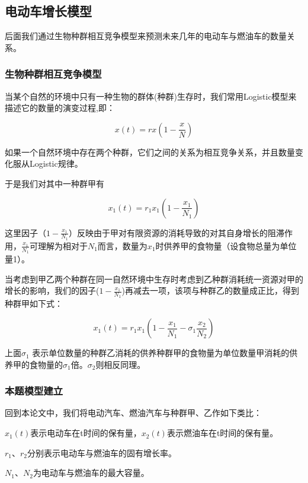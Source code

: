 \documentclass[12pt, a4paper, oneside]{ctexart}
\begin{document}
\subsection{电动车增长模型}
后面我们通过生物种群相互竞争模型来预测未来几年的电动车与燃油车的数量关系。

\subsubsection{生物种群相互竞争模型}

当某个自然的环境中只有一种生物的群体(种群)生存时，我们常用Logistic模型来描述它的数量的演变过程,即：

\begin{dmath}
  x(t)=rx(1-\frac{x}{N})
\end{dmath}

如果一个自然环境中存在两个种群，它们之间的关系为相互竞争关系，并且数量变化服从Logistic规律。

于是我们对其中一种群甲有

\begin{dmath}
  x_1(t)=r_1x_1(1-\frac{x_1}{N_1})
\end{dmath}

这里因子（\(1-\frac{x_1}{N_1}\)）反映由于甲对有限资源的消耗导致的对其自身增长的阻滞作用，$\frac{x_1}{N_1}$可理解为相对于$N_1$而言，数量为$x_1$时供养甲的食物量（设食物总量为单位量1）。

当考虑到甲乙两个种群在同一自然环境中生存时考虑到乙种群消耗统一资源对甲的增长的影响，我们的因子($1-\frac{x_1}{N_1}$)再减去一项，该项与种群乙的数量成正比，得到种群甲如下式：

\begin{dmath}x_1(t)=r_1x_1\left(1-\frac{x_1}{N_1}-\sigma_1\frac{x_2}{N_2}\right)\end{dmath}

上面$\sigma_1$
  表示单位数量的种群乙消耗的供养种群甲的食物量为单位数量甲消耗的供养甲的食物量的$\sigma_1$倍。$\sigma_2$则相反同理。

\subsubsection{本题模型建立}

回到本论文中，我们将电动汽车、燃油汽车与种群甲、乙作如下类比：

$x_1(t)$表示电动车在t时间的保有量，$x_2(t)$表示燃油车在t时间的保有量。

$r_1$、$r_2$分别表示电动车与燃油车的固有增长率。

$N_1$、$N_2$为电动车与燃油车的最大容量。
\end{document}
